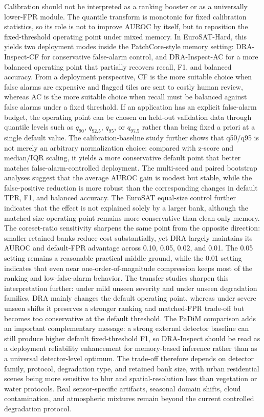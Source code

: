\documentclass[remotesensing,article,submit,pdftex,moreauthors]{Definitions/mdpi}
\begin{document}
Calibration should not be interpreted as a ranking booster or as a universally lower-FPR module. The quantile transform is monotonic for fixed calibration statistics, so its role is not to improve AUROC by itself, but to reposition the fixed-threshold operating point under mixed memory. In EuroSAT-Hard, this yields two deployment modes inside the PatchCore-style memory setting: DRA-Inspect-CF for conservative false-alarm control, and DRA-Inspect-AC for a more balanced operating point that partially recovers recall, F1, and balanced accuracy. From a deployment perspective, CF is the more suitable choice when false alarms are expensive and flagged tiles are sent to costly human review, whereas AC is the more suitable choice when recall must be balanced against false alarms under a fixed threshold. If an application has an explicit false-alarm budget, the operating point can be chosen on held-out validation data through quantile levels such as $q_{90}$, $q_{92.5}$, $q_{95}$, or $q_{97.5}$ rather than being fixed a priori at a single default value. The calibration-baseline study further shows that q50/q95 is not merely an arbitrary normalization choice: compared with z-score and median/IQR scaling, it yields a more conservative default point that better matches false-alarm-controlled deployment. The multi-seed and paired bootstrap analyses suggest that the average AUROC gain is modest but stable, while the false-positive reduction is more robust than the corresponding changes in default TPR, F1, and balanced accuracy. The EuroSAT equal-size control further indicates that the effect is not explained solely by a larger bank, although the matched-size operating point remains more conservative than clean-only memory. The coreset-ratio sensitivity sharpens the same point from the opposite direction: smaller retained banks reduce cost substantially, yet DRA largely maintains its AUROC and default-FPR advantage across 0.10, 0.05, 0.02, and 0.01. The 0.05 setting remains a reasonable practical middle ground, while the 0.01 setting indicates that even near one-order-of-magnitude compression keeps most of the ranking and low-false-alarm behavior. The transfer studies sharpen this interpretation further: under mild unseen severity and under unseen degradation families, DRA mainly changes the default operating point, whereas under severe unseen shifts it preserves a stronger ranking and matched-FPR trade-off but becomes too conservative at the default threshold. The PaDiM comparison adds an important complementary message: a strong external detector baseline can still produce higher default fixed-threshold F1, so DRA-Inspect should be read as a deployment reliability enhancement for memory-based inference rather than as a universal detector-level optimum. The trade-off therefore depends on detector family, protocol, degradation type, and retained bank size, with urban residential scenes being more sensitive to blur and spatial-resolution loss than vegetation or water protocols. Real sensor-specific artifacts, seasonal domain shifts, cloud contamination, and atmospheric mixtures remain beyond the current controlled degradation protocol.
\end{document}

